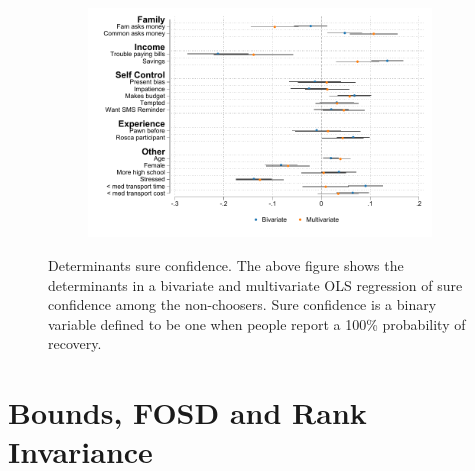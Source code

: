 \begin{appendix}
\begin{figure}[H]
    \begin{center}
    \begin{subfigure}{0.6\textwidth}
        \centering
        \includegraphics[width=\textwidth]{Figuras/determinants_confidence_100.pdf}
    \end{subfigure}
    \end{center}
    \caption{Determinants sure confidence. The above figure shows the determinants in a bivariate and multivariate OLS regression of sure confidence among the non-choosers. Sure confidence is a binary variable defined to be one when people report a 100\% probability of recovery.}
    \label{determinants_sure}
\end{figure}




\section{Bounds, FOSD and Rank Invariance} \label{bounds_FOSD}


\end{appendix}
